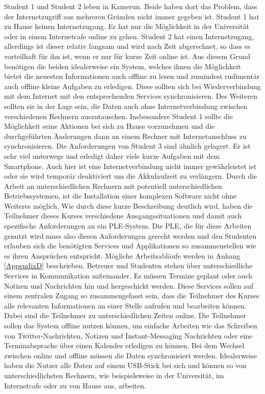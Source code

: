Student 1 und Student 2 leben in Kamerun. Beide haben dort das Problem, dass der Internetzugriff aus mehreren Gründen nicht immer gegeben ist. Student 1 hat zu Hause keinen Internetzugang. Er hat nur die Möglichkeit in der Universität oder in einem Internetcafe online zu gehen. Student 2 hat einen Internetzugang, allerdings ist dieser relativ langsam und wird nach Zeit abgerechnet, so dass es vorteilhaft für ihn ist, wenn er nur für kurze Zeit online ist. Aus diesem Grund benötigen die beiden idealerweise ein System, welches ihnen die Möglichkeit bietet die neuesten Informationen auch offline zu lesen und zumindest rudimentär auch offline kleine Aufgaben zu erledigen. Diese sollten sich bei Wiederverbindung mit dem Internet mit den entsprechenden Services synchronisieren. Des Weiteren sollten sie in der Lage sein, die Daten auch ohne Internetverbindung zwischen verschiedenen Rechnern auszutauschen. Insbesondere Student 1 sollte die Möglichkeit seine Aktionen bei sich zu Hause vorzunehmen und die durchgeführten Änderungen dann an einem Rechner mit Internetanschluss zu synchronisieren. Die Anforderungen von Student 3 sind ähnlich gelagert. Er ist sehr viel unterwegs und erledigt daher viele kurze Aufgaben mit dem Smartphone. Auch hier ist eine Internetverbindung nicht immer gewährleistet ist oder sie wird temporär deaktiviert um die Akkulaufzeit zu verlängern. Durch die Arbeit an unterschiedlichen Rechnern mit potentiell unterschiedlichen Betriebssystemen, ist die Installation einer komplexen Software nicht ohne Weiteres möglich. Wie durch diese kurze Beschreibung deutlich wird, haben die Teilnehmer dieses Kurses verschiedene Ausgangssituationen und damit auch spezifische Anforderungen an ein PLE-System. Die PLE, die für diese Arbeiten genutzt wird muss also diesen Anforderungen gerecht werden und den Studenten erlauben sich die benötigten Services und Applikationen so zusammenstellen wie es ihren Ansprüchen entspricht. Mögliche Arbeitsabläufe werden in Anhang \ref{AppendixD} beschrieben. Betreuer und Studenten stehen über unterschiedliche Services in Kommunikation miteinander. Es müssen Termine geplant oder auch Notizen und Nachrichten hin und hergeschickt werden. Diese Services sollen auf einem zentralen Zugang so zusammengefasst sein, dass die Teilnehmer des Kurses alle relevanten Informationen an einer Stelle aufrufen und bearbeiten können. Dabei sind die Teilnehmer zu unterschiedlichen Zeiten online. Die Teilnehmer sollen das System offline nutzen können, um einfache Arbeiten wie das Schreiben von Twitter-Nachrichten, Notizen und Instant-Messaging Nachrichten oder eine Terminabsprache über einen Kalender erledigen zu können. Bei dem Wechsel zwischen online und offline müssen die Daten synchronisiert werden. Idealerweise haben die Nutzer alle Daten auf einem USB-Stick bei sich und können so von unterschiedlichsten Rechnern, wie beispielsweise in der Universität, im Internetcafe oder zu von Hause aus, arbeiten.


